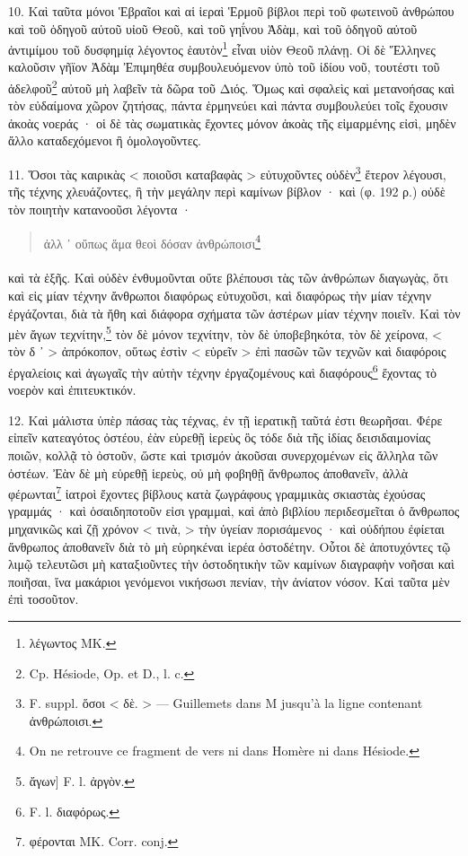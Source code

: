 \documentclass[a4paper, 11pt, oneside, polutonikogreek, french]{article}
\begin{document}
10. Καὶ ταῦτα μόνοι Ἑβραῖοι καὶ αἱ ἱεραὶ Ἑρμοῦ βίβλοι περὶ τοῦ φωτεινοῦ ἀνθρώπου καὶ τοῦ ὁδηγοῦ αὐτοῦ υἰοῦ Θεοῦ, καὶ τοῦ γηΐνου Ἀδὰμ, καὶ τοῦ ὁδηγοῦ αὐτοῦ ἀντιμίμου τοῦ δυσφημίᾳ λέγοντος ἑαυτὸν\footnote{λέγωντος MK.} εἶναι υἱὸν Θεοῦ πλάνῃ. Οἱ δὲ Ἕλληνες καλοῦσιν γῆϊον Ἀδὰμ Ἐπιμηθέα συμβουλευόμενον ὑπὸ τοῦ ἰδίου νοῦ, τουτέστι τοῦ ἀδελφοῦ\footnote{Cp. Hésiode, Op. et D., l. c.} αὐτοῦ μὴ λαβεῖν τὰ δῶρα τοῦ Διός. Ὅμως καὶ σφαλεὶς καὶ μετανοήσας καὶ τὸν εὐδαίμονα χῶρον ζητήσας, πάντα ἑρμηνεύει καὶ πάντα συμβουλεύει τοῖς ἔχουσιν ἀκοὰς νοεράς · οἱ δὲ τὰς σωματικὰς ἔχοντες μόνον ἀκοὰς τῆς εἱμαρμένης εἰσὶ, μηδὲν ἄλλο καταδεχόμενοι ἢ ὁμολογοῦντες.

11. Ὅσοι τὰς καιρικὰς < ποιοῦσι καταβαφὰς > εὐτυχοῦντες οὐδὲν\footnote{F. suppl. ὅσοι < δὲ. > --- Guillemets dans M jusqu'à la ligne contenant ἀνθρώποισι.} ἕτερον λέγουσι, τῆς τέχνης χλευάζοντες, ἢ τὴν μεγάλην περὶ καμίνων βίβλον · καὶ (φ. 192 ρ.) οὐδὲ τὸν ποιητὴν κατανοοῦσι λέγοντα ·
\begin{quotation}
ἀλλ ᾽ οὔπως ἅμα θεοὶ δόσαν ἀνθρώποισι\footnote{On ne retrouve ce fragment de vers ni dans Homère ni dans Hésiode.}
\end{quotation}
\paragraph{}
καὶ τὰ ἑξῆς. Καὶ οὐδὲν ἐνθυμοῦνται οὔτε βλέπουσι τὰς τῶν ἀνθρώπων διαγωγὰς, ὅτι καὶ εἰς μίαν τέχνην ἄνθρωποι διαφόρως εὐτυχοῦσι, καὶ διαφόρως τὴν μίαν τέχνην ἐργάζονται, διὰ τὰ ἤθη καὶ διάφορα σχήματα τῶν ἀστέρων μίαν τέχνην ποιεῖν. Καὶ τὸν μὲν ἄγων τεχνίτην,\footnote{ἄγων] F. l. ἀργὸν.} τὸν δὲ μόνον τεχνίτην, τὸν δὲ ὑποβεβηκότα, τὸν δὲ χείρονα, < τὸν δ ᾽ > ἀπρόκοπον, οὕτως ἐστὶν < εὑρεῖν > ἐπὶ πασῶν τῶν τεχνῶν καὶ διαφόροις ἐργαλείοις καὶ ἀγωγαῖς τὴν αὐτὴν τέχνην ἐργαζομένους καὶ διαφόρους\footnote{F. l. διαφόρως.} ἔχοντας τὸ νοερὸν καὶ ἐπιτευκτικόν.

12. Καὶ μάλιστα ὑπὲρ πάσας τὰς τέχνας, ἐν τῇ ἱερατικῇ ταῦτά ἐστι θεωρῆσαι. Φέρε εἰπεῖν κατεαγότος ὀστέου, ἐὰν εὑρεθῇ ἱερεὺς ὃς τόδε διὰ τῆς ἰδίας δεισιδαιμονίας ποιῶν, κολλᾷ τὸ ὀστοῦν, ὥστε καὶ τρισμόν ἀκοῦσαι συνερχομένων εἰς ἄλληλα τῶν ὀστέων. Ἐὰν δὲ μὴ εὑρεθῇ ἱερεὺς, οὐ μὴ φοβηθῇ ἄνθρωπος ἀποθανεῖν, ἀλλὰ φέρωνται\footnote{φέρονται MK. Corr. conj.} ἰατροὶ ἔχοντες βίβλους κατὰ ζωγράφους γραμμικὰς σκιαστὰς ἐχούσας γραμμάς · καὶ ὁσαιδηποτοῦν εἰσι γραμμαὶ, καὶ ἀπὸ βιβλίου περιδεσμεῖται ὁ ἄνθρωπος μηχανικῶς καὶ ζῇ χρόνον < τινὰ, > τὴν ὑγείαν πορισάμενος · καὶ οὐδήπου ἐφίεται ἄνθρωπος ἀποθανεῖν διὰ τὸ μὴ εὑρηκέναι ἱερέα ὀστοδέτην. Οὗτοι δὲ ἀποτυχόντες τῷ λιμῷ τελευτῶσι μὴ καταξιοῦντες τὴν ὀστοδητικὴν τῶν καμίνων διαγραφὴν νοῆσαι καὶ ποιῆσαι, ἵνα μακάριοι γενόμενοι νικήσωσι πενίαν, τὴν ἀνίατον νόσον. Καὶ ταῦτα μὲν ἐπὶ τοσοῦτον.
\end{document}
